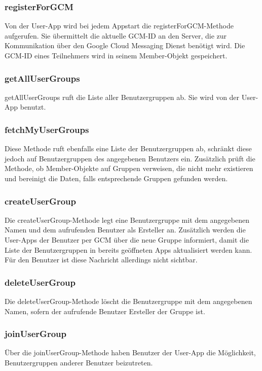\subsubsection*{registerForGCM}
Von der User-App wird bei jedem Appstart die registerForGCM-Methode aufgerufen. Sie übermittelt die aktuelle GCM-ID an den Server, die zur Kommunikation über den Google Cloud Messaging Dienst benötigt wird. Die GCM-ID eines Teilnehmers wird in seinem Member-Objekt gespeichert.

\subsubsection*{getAllUserGroups}
getAllUserGroups ruft die Liste aller Benutzergruppen ab. Sie wird von der User-App benutzt.

\subsubsection*{fetchMyUserGroups}
Diese Methode ruft ebenfalls eine Liste der Benutzergruppen ab, schränkt diese jedoch auf Benutzergruppen des angegebenen Benutzers ein. Zusätzlich prüft die Methode, ob Member-Objekte auf Gruppen verweisen, die nicht mehr existieren und bereinigt die Daten, falls entsprechende Gruppen gefunden werden.

\subsubsection*{createUserGroup}
Die createUserGroup-Methode legt eine Benutzergruppe mit dem angegebenen Namen und dem aufrufenden Benutzer als Ersteller an. Zusätzlich werden die User-Apps der Benutzer per GCM über die neue Gruppe informiert, damit die Liste der Benutzergruppen in bereits geöffneten Apps aktualisiert werden kann. Für den Benutzer ist diese Nachricht allerdings nicht sichtbar.

\subsubsection*{deleteUserGroup}
Die deleteUserGroup-Methode löscht die Benutzergruppe mit dem angegebenen Namen, sofern der aufrufende Benutzer Ersteller der Gruppe ist.

\subsubsection*{joinUserGroup}
Über die joinUserGroup-Methode haben Benutzer der User-App die Möglichkeit, Benutzergruppen anderer Benutzer beizutreten.

